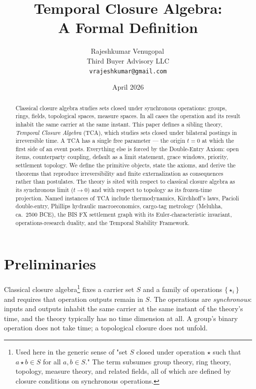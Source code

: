 \documentclass[11pt]{article}
\title{\bfseries Temporal Closure Algebra:\\[0.3em]
  {\large A Formal Definition}}
\author{Rajeshkumar Venugopal\,\orcidlink{0009-0002-1838-5976}\\
  Third Buyer Advisory LLC\\
  \texttt{vrajeshkumar@gmail.com}}
\date{April 2026}
\begin{document}
\maketitle
\skip\footins=10pt

\begin{abstract}
\noindent
Classical closure algebra studies sets closed under synchronous operations: groups, rings, fields, topological spaces, measure spaces. In all cases the operation and its result inhabit the same carrier at the same instant. This paper defines a sibling theory, \emph{Temporal Closure Algebra} (TCA), which studies sets closed under bilateral postings in irreversible time. A TCA has a single free parameter — the origin $t = 0$ at which the first side of an event posts. Everything else is forced by the Double-Entry Axiom: open items, counterparty coupling, default as a limit statement, grace windows, priority, settlement topology. We define the primitive objects, state the axioms, and derive the theorems that reproduce irreversibility and finite externalization as consequences rather than postulates. The theory is sited with respect to classical closure algebra as its synchronous limit ($t \to 0$) and with respect to topology as its frozen-time projection. Named instances of TCA include thermodynamics, Kirchhoff's laws, Pacioli double-entry, Phillips hydraulic macroeconomics, cargo-tag metrology (Meluhha, ca.\ 2500 BCE), the BIS FX settlement graph with its Euler-characteristic invariant, operations-research duality, and the Temporal Stability Framework.
\end{abstract}

\section{Preliminaries}

Classical closure algebra\footnote{Used here in the generic sense of "set $S$ closed under operation $\star$ such that $a \star b \in S$ for all $a, b \in S$." The term subsumes group theory, ring theory, topology, measure theory, and related fields, all of which are defined by closure conditions on synchronous operations.} fixes a carrier set $S$ and a family of operations $\{\star_i\}$ and requires that operation outputs remain in $S$. The operations are \emph{synchronous}: inputs and outputs inhabit the same carrier at the same instant of the theory's time, and the theory typically has no time dimension at all. A group's binary operation does not take time; a topological closure does not unfold.
\end{document}
